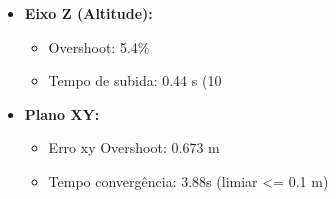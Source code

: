 \begin{itemize}
  \item \textbf{Eixo Z (Altitude):}
  \begin{itemize}
    \item Overshoot: 5.4\%
    \item Tempo de subida: 0.44 s (10%
  \end{itemize}
  \item \textbf{Plano XY:}
  \begin{itemize}
    \item Erro xy Overshoot: 0.673 m
    \item Tempo convergência: 3.88s (limiar <= 0.1 m)
  \end{itemize}
\end{itemize}
